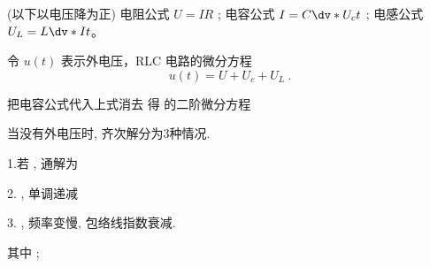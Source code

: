 
\begin{issues}
\issueDraft
\end{issues}


(以下以电压降为正)
电阻公式 $U=IR$ ; 电容公式 $I=C\dv*{U_c}{t}$ ; 电感公式 $U_L=L\dv*{I}{t}$。

令 $u(t)$ 表示外电压，RLC 电路的微分方程
\begin{equation}
u(t) = U + U_c + U_L~.
\end{equation}

把电容公式代入上式消去 得 的二阶微分方程
 
当没有外电压时, 齐次解分为3种情况.

1.若 , 通解为
 
2.  , 单调递减
 
3.  , 频率变慢, 包络线指数衰减.
 
其中 ;  
